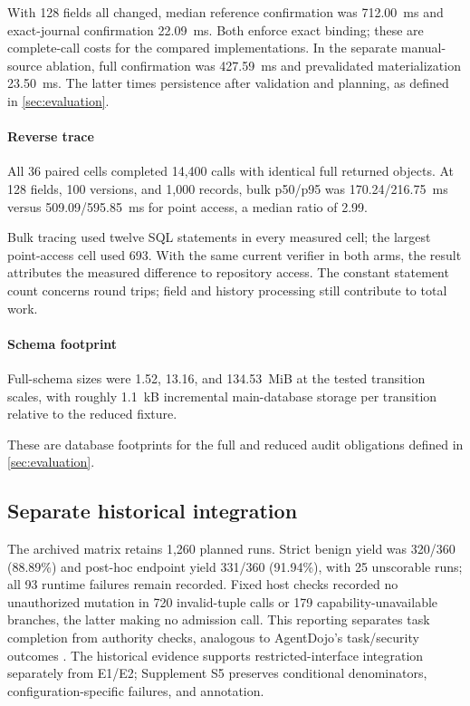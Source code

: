 

With 128 fields all changed, median reference confirmation was 712.00~ms and exact-journal confirmation 22.09~ms. Both enforce exact binding; these are complete-call costs for the compared implementations. In the separate manual-source ablation, full confirmation was 427.59~ms and prevalidated materialization 23.50~ms. The latter times persistence after validation and planning, as defined in \cref{sec:evaluation}.

\paragraph{Reverse trace}
All 36 paired cells completed 14,400 calls with identical full returned objects. At 128 fields, 100 versions, and 1,000 records, bulk p50/p95 was 170.24/216.75~ms versus 509.09/595.85~ms for point access, a median ratio of 2.99.



Bulk tracing used twelve SQL statements in every measured cell; the largest point-access cell used 693. With the same current verifier in both arms, the result attributes the measured difference to repository access. The constant statement count concerns round trips; field and history processing still contribute to total work.

\paragraph{Schema footprint}
Full-schema sizes were 1.52, 13.16, and 134.53~MiB at the tested transition scales, with roughly 1.1~kB incremental main-database storage per transition relative to the reduced fixture.



These are database footprints for the full and reduced audit obligations defined in \cref{sec:evaluation}.

\subsection{Separate historical integration}
\label{sec:historical-integration}

The archived matrix retains 1,260 planned runs. Strict benign yield was 320/360 (88.89\%) and post-hoc endpoint yield 331/360 (91.94\%), with 25 unscorable runs; all 93 runtime failures remain recorded. Fixed host checks recorded no unauthorized mutation in 720 invalid-tuple calls or 179 capability-unavailable branches, the latter making no admission call. This reporting separates task completion from authority checks, analogous to AgentDojo's task/security outcomes \citep{debenedetti2024agentdojo}. The historical evidence supports restricted-interface integration separately from E1/E2; Supplement S5 preserves conditional denominators, configuration-specific failures, and annotation.
